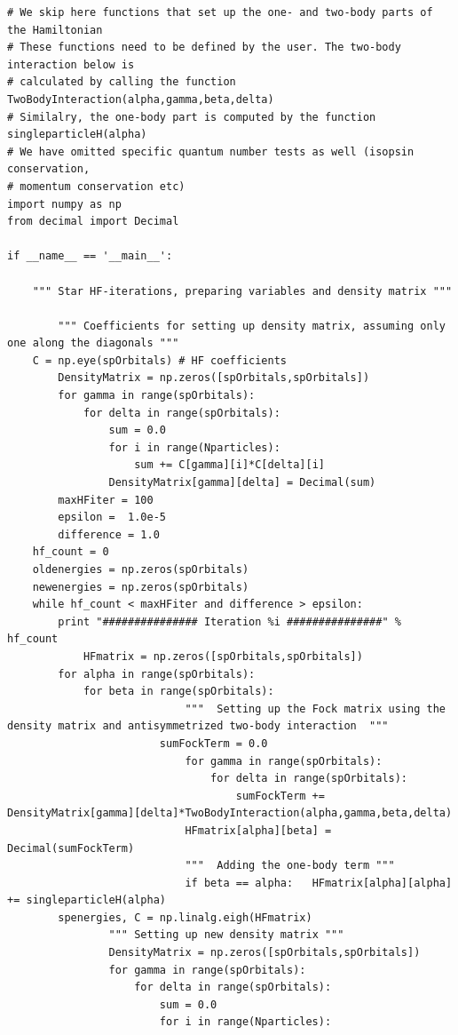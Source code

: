 \begin{lstlisting}
# We skip here functions that set up the one- and two-body parts of the Hamiltonian 
# These functions need to be defined by the user. The two-body interaction below is
# calculated by calling the function TwoBodyInteraction(alpha,gamma,beta,delta)
# Similalry, the one-body part is computed by the function singleparticleH(alpha)
# We have omitted specific quantum number tests as well (isopsin conservation, 
# momentum conservation etc)
import numpy as np 
from decimal import Decimal

if __name__ == '__main__':
	
	""" Star HF-iterations, preparing variables and density matrix """

        """ Coefficients for setting up density matrix, assuming only one along the diagonals """
	C = np.eye(spOrbitals) # HF coefficients
        DensityMatrix = np.zeros([spOrbitals,spOrbitals])
        for gamma in range(spOrbitals):
            for delta in range(spOrbitals):
                sum = 0.0
                for i in range(Nparticles):
                    sum += C[gamma][i]*C[delta][i]
                DensityMatrix[gamma][delta] = Decimal(sum)
        maxHFiter = 100
        epsilon =  1.0e-5 
        difference = 1.0
	hf_count = 0
	oldenergies = np.zeros(spOrbitals)
	newenergies = np.zeros(spOrbitals)
	while hf_count < maxHFiter and difference > epsilon:
		print "############### Iteration %i ###############" % hf_count
   	        HFmatrix = np.zeros([spOrbitals,spOrbitals])		
		for alpha in range(spOrbitals):
			for beta in range(spOrbitals):
                            """  Setting up the Fock matrix using the density matrix and antisymmetrized two-body interaction  """
     		            sumFockTerm = 0.0
                            for gamma in range(spOrbitals):
                                for delta in range(spOrbitals):
                                    sumFockTerm += DensityMatrix[gamma][delta]*TwoBodyInteraction(alpha,gamma,beta,delta)
                            HFmatrix[alpha][beta] = Decimal(sumFockTerm)
                            """  Adding the one-body term """
                            if beta == alpha:   HFmatrix[alpha][alpha] += singleparticleH(alpha)
		spenergies, C = np.linalg.eigh(HFmatrix)
                """ Setting up new density matrix """
                DensityMatrix = np.zeros([spOrbitals,spOrbitals])
                for gamma in range(spOrbitals):
                    for delta in range(spOrbitals):
                        sum = 0.0
                        for i in range(Nparticles):

\end{lstlisting}
